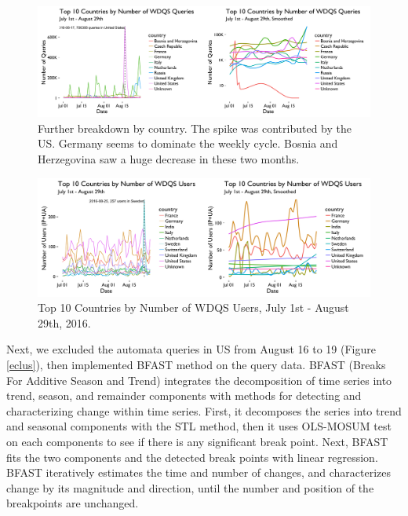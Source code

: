 \documentclass[12pt,]{article}
\begin{document}
\begin{figure}[H]
\centering
\includegraphics{figures/query_country_ts.png}
\caption{Further breakdown by country. The spike was contributed by the
US. Germany seems to dominate the weekly cycle. Bosnia and Herzegovina
saw a huge decrease in these two months.}
\end{figure}

\begin{figure}[H]
\centering
\includegraphics{figures/user_country_ts.png}
\caption{Top 10 Countries by Number of WDQS Users, July 1st - August
29th, 2016.}
\end{figure}

Next, we excluded the automata queries in US from August 16 to 19
(Figure \ref{eclus}), then implemented BFAST method on the query data.
BFAST (Breaks For Additive Season and Trend) integrates the
decomposition of time series into trend, season, and remainder
components with methods for detecting and characterizing change within
time series. First, it decomposes the series into trend and seasonal
components with the STL method, then it uses OLS-MOSUM test on each
components to see if there is any significant break point. Next, BFAST
fits the two components and the detected break points with linear
regression. BFAST iteratively estimates the time and number of changes,
and characterizes change by its magnitude and direction, until the
number and position of the breakpoints are unchanged.
\end{document}
